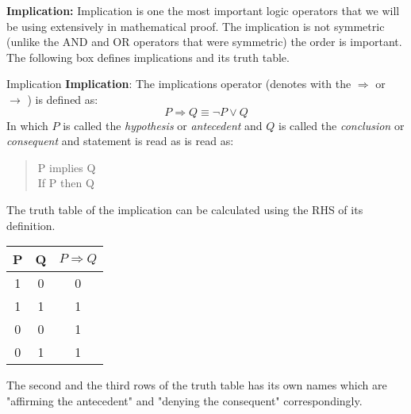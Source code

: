 \textbf{Implication:} Implication is one the most important logic operators that we will be using extensively in mathematical proof. The implication is not symmetric (unlike the AND and OR operators that were symmetric) the order is important. The following box defines implications and its truth table.

\begin{defbox}{Implication}
	\textbf{Implication}: The implications operator (denotes with the $\Rightarrow$ or $\rightarrow$ ) is defined as:
	\[  P \Rightarrow Q \equiv \neg P \vee Q \]
	In which $ P $ is called the \emph{hypothesis} or \emph{antecedent} and $ Q $ is called the \emph{conclusion} or \emph{consequent} and statement is read as is read as: 
	\begin{quote}
		P implies Q\\
		If P then Q
	\end{quote}
	The truth table of the implication can be calculated using the RHS of its definition. 
	\begin{center}
		\begin{tabular}{|c|c|c|}
			\hline
			P & Q & $ P \Rightarrow Q $ \\
			\hline
			1 & 0 & 0 \\
			\hline
			1 & 1 & 1 \\
			\hline
			0 & 0 & 1 \\
			\hline
			0 & 1 & 1 \\
			\hline
		\end{tabular}
	\end{center}

The second and the third rows of the truth table has its own names which are "affirming the antecedent" and "denying the consequent" correspondingly.

\end{defbox}

